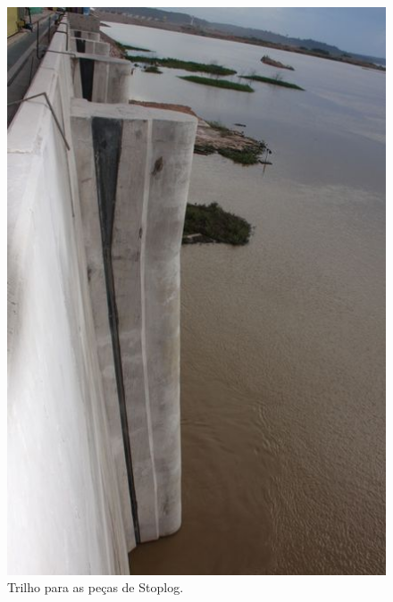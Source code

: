 \begin{figure}[h!]
    \centering \includegraphics[scale=0.4]{figs/jirau/jirau_16}
    \caption{Trilho para as peças de Stoplog.}
    \label{fig:jirau16}
\end{figure}

